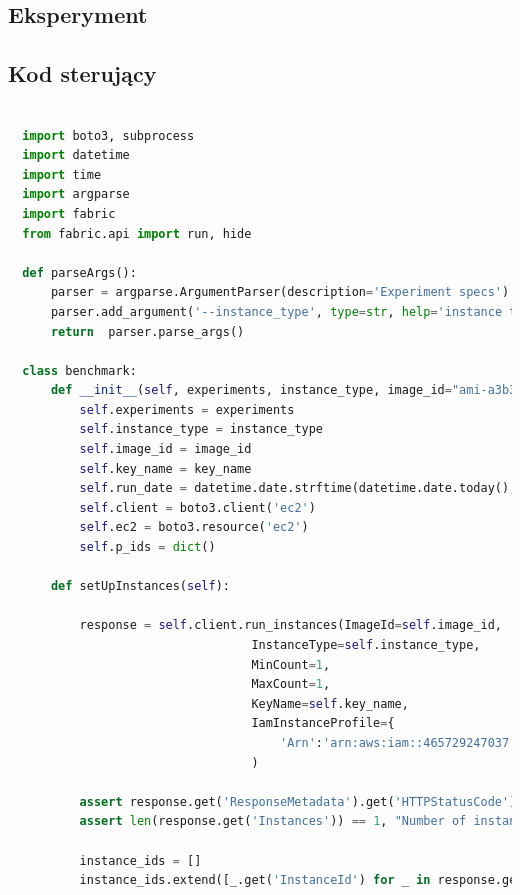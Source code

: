 \documentclass[12pt,a4paper,twoside]{article}
\begin{document}
\begin{appendices}

\section{Eksperyment}

\subsection{Kod sterujący}

\begin{lstlisting}[language=python]

  import boto3, subprocess
  import datetime
  import time
  import argparse
  import fabric
  from fabric.api import run, hide

  def parseArgs():
      parser = argparse.ArgumentParser(description='Experiment specs')
      parser.add_argument('--instance_type', type=str, help='instance type')
      return  parser.parse_args()

  class benchmark:
      def __init__(self, experiments, instance_type, image_id="ami-a3b3d4b5", key_name='dpcld_test1'):
          self.experiments = experiments
          self.instance_type = instance_type
          self.image_id = image_id
          self.key_name = key_name
          self.run_date = datetime.date.strftime(datetime.date.today(), '%Y%m%d')
          self.client = boto3.client('ec2')
          self.ec2 = boto3.resource('ec2')
          self.p_ids = dict()

      def setUpInstances(self):

          response = self.client.run_instances(ImageId=self.image_id,
                                  InstanceType=self.instance_type,
                                  MinCount=1,
                                  MaxCount=1,
                                  KeyName=self.key_name,
                                  IamInstanceProfile={
                                      'Arn':'arn:aws:iam::465729247037:instance-profile/S3_Admin_Access'}
                                  )

          assert response.get('ResponseMetadata').get('HTTPStatusCode') == 200, "Request ended with an error (HTTPStatusCode != 200)"
          assert len(response.get('Instances')) == 1, "Number of instances launched is equal to specified"

          instance_ids = []
          instance_ids.extend([_.get('InstanceId') for _ in response.get('Instances')])


\end{lstlisting}
\end{appendices}
\end{document}
